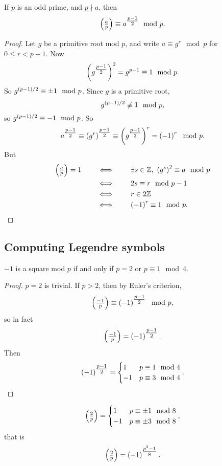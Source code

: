 
\begin{theorem}
If $ p $ is an odd prime, and $ p \nmid a $, then
$$ \left( \tfrac{a}{p} \right) \equiv a^{\tfrac{p - 1}{2}} \mod p. $$
\end{theorem}

\begin{proof}
Let $ g $ be a primitive root mod $ p $, and write $ a \equiv g^r \mod p $ for $ 0 \le r < p - 1 $. Now
$$ \left( g^{\tfrac{p - 1}{2}} \right)^2 = g^{p - 1} \equiv 1 \mod p. $$
So $ g^{\left( p - 1 \right) / 2} \equiv \pm 1 \mod p $. Since $ g $ is a primitive root,
$$ g^{\left( p - 1 \right) / 2} \not\equiv 1 \mod p, $$
so $ g^{\left( p - 1 \right) / 2} \equiv -1 \mod p $. So
$$ a^{\tfrac{p - 1}{2}} \equiv \left( g^r \right)^{\tfrac{p - 1}{2}} \equiv \left( g^{\tfrac{p - 1}{2}} \right)^r = \left( -1 \right)^r \mod p. $$
But
\begin{align*}
\left( \tfrac{a}{p} \right) = 1 \qquad
& \iff \qquad \exists s \in \mathbb{Z}, \ \left( g^s \right)^2 \equiv a \mod p \\
& \iff \qquad 2s \equiv r \mod p - 1 \\
& \iff \qquad r \in 2\mathbb{Z} \\
& \iff \qquad \left( -1 \right)^r \equiv 1 \mod p.
\end{align*}
\end{proof}

\subsection{Computing Legendre symbols}

\begin{proposition}
$ -1 $ is a square mod $ p $ if and only if $ p = 2 $ or $ p \equiv 1 \mod 4 $.
\end{proposition}

\begin{proof}
$ p = 2 $ is trivial. If $ p > 2 $, then by Euler's criterion,
$$ \left( \tfrac{-1}{p} \right) \equiv \left( -1 \right)^{\tfrac{p - 1}{2}} \mod p, $$
so in fact
$$ \left( \tfrac{-1}{p} \right) = \left( -1 \right)^{\tfrac{p - 1}{2}}. $$
Then
$$ \left( -1 \right)^{\tfrac{p - 1}{2}} = \begin{cases}
1 & p \equiv 1 \mod 4 \\
-1 & p \equiv 3 \mod 4
\end{cases}. $$
\end{proof}

\begin{proposition}
$$ \left( \tfrac{2}{p} \right) = \begin{cases}
1 & p \equiv \pm 1 \mod 8 \\
-1 & p \equiv \pm 3 \mod 8
\end{cases}, $$
that is
$$ \left( \tfrac{2}{p} \right) = \left( -1 \right)^{\tfrac{p^2 - 1}{8}}. $$
\end{proposition}

